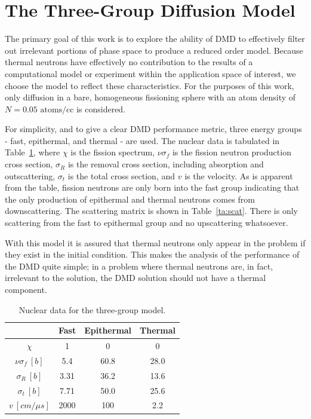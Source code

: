 \documentclass[12pt]{article}
\newcommand{\LTA}[1]{\label{ta:#1}}
\newcommand{\TA}[1]{Table~\ref{ta:#1}}
\newcommand{\bt}{\begin{table}}
\newcommand{\et}{\end{table}}
\newcommand{\btb}{\begin{center}\begin{tabular}}
\newcommand{\etb}{\end{tabular}\end{center}}
\begin{document}
\section{The Three-Group Diffusion Model}
The primary goal of this work is to explore the ability of DMD to effectively filter out irrelevant portions 
	of phase space to produce a reduced order model.  
Because thermal neutrons have effectively no contribution to the results of a computational model or 
	experiment within the application space of interest, we choose the model to reflect these characteristics. 
For the purposes of this  work, only diffusion in a bare, homogeneous fissioning sphere with an atom density of $N = 0.05 \text{ atoms/cc}$ is considered. 

For simplicity, and to give a clear DMD performance metric, three energy groups - fast, epithermal, and thermal - are used.  
The nuclear data is tabulated in \TA{xs_data}, where $\chi$ is the fission spectrum, $\nu\sigma_f$ is 
	the fission neutron production cross section, $\sigma_R$ is the removal cross section, including  
	absorption and outscattering, $\sigma_t$ is the total cross section, and $v$ is the velocity.  
As is apparent from the table, fission neutrons are only born into the fast group indicating that the 
	only production of epithermal and thermal neutrons comes from downscattering. 
The scattering matrix is shown in \TA{scat}.  
There is only scattering from the fast to epithermal group and no upscattering whatsoever.  

With this model it is assured that thermal neutrons only appear in the problem if they exist in the initial condition.  
This makes the analysis of the performance of the DMD quite simple; in a problem where thermal 
	neutrons are, in fact, irrelevant to the solution, the DMD solution should not have a thermal component. 

\bt[h] \centering 
	\caption{Nuclear data for the three-group model.} 
	\btb{|c|c|c|c|}
		\hline
		\diagbox{Reaction}{Group} & Fast  & Epithermal  & Thermal  \\  \hline
		$\chi$  & 1 & 0 & 0 \\ 	\hline
		$\nu\sigma_f \ [b]$ & 5.4 & 60.8 & 28.0 \\  \hline
		$\sigma_R \ [b]$  & 3.31 & 36.2 & 13.6 \\  \hline
		$\sigma_t \ [b]$ & 7.71 & 50.0 & 25.6\\ \hline
		$v \ [cm/\mu s]$ & 2000 & 100 & 2.2 \\  \hline
	\etb  \LTA{xs_data}
\et
\end{document}
